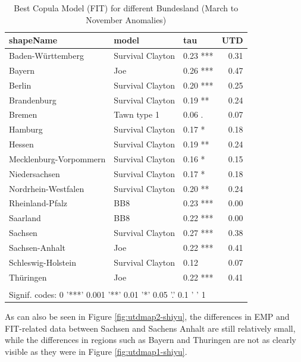 \documentclass[
]{krantz}
\begin{document}
\begin{table}

\caption{\label{tab:tab6-shiyu}Best Copula Model (FIT) for different Bundesland (March to November Anomalies)}
\centering
\begin{tabular}[t]{l|l|l|r}
\hline
shapeName & model & tau & UTD\\
\hline
Baden-Württemberg & Survival Clayton & 0.23 *** & 0.31\\
\hline
Bayern & Joe & 0.26 *** & 0.47\\
\hline
Berlin & Survival Clayton & 0.20 *** & 0.25\\
\hline
Brandenburg & Survival Clayton & 0.19 ** & 0.24\\
\hline
Bremen & Tawn type 1 & 0.06 . & 0.07\\
\hline
Hamburg & Survival Clayton & 0.17 * & 0.18\\
\hline
Hessen & Survival Clayton & 0.19 ** & 0.24\\
\hline
Mecklenburg-Vorpommern & Survival Clayton & 0.16 * & 0.15\\
\hline
Niedersachsen & Survival Clayton & 0.17 * & 0.18\\
\hline
Nordrhein-Westfalen & Survival Clayton & 0.20 ** & 0.24\\
\hline
Rheinland-Pfalz & BB8 & 0.23 *** & 0.00\\
\hline
Saarland & BB8 & 0.22 *** & 0.00\\
\hline
Sachsen & Survival Clayton & 0.27 *** & 0.38\\
\hline
Sachsen-Anhalt & Joe & 0.22 *** & 0.41\\
\hline
Schleswig-Holstein & Survival Clayton & 0.12 & 0.07\\
\hline
Thüringen & Joe & 0.22 *** & 0.41\\
\hline
\multicolumn{4}{l}{\textsuperscript{} Signif. codes: 0 '***' 0.001 '**' 0.01 '*' 0.05 '.' 0.1 ' ' 1}\\
\end{tabular}
\end{table}

As can also be seen in Figure \ref{fig:utdmap2-shiyu}, the differences in EMP and FIT-related data between Sachsen and Sachens Anhalt are still relatively small, while the differences in regions such as Bayern and Thuringen are not as clearly visible as they were in Figure \ref{fig:utdmap1-shiyu}.
\end{document}
